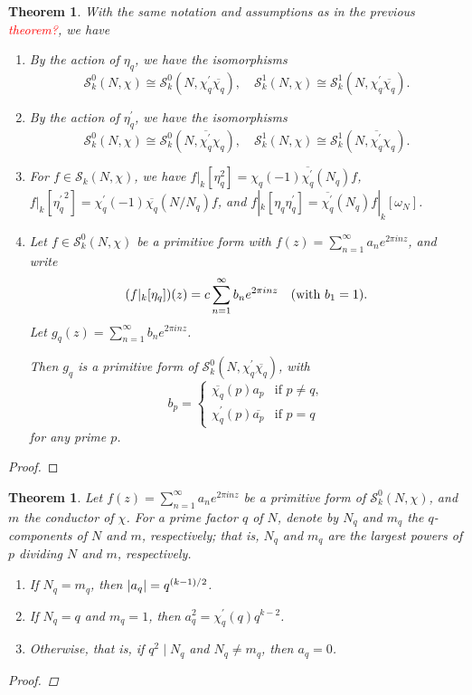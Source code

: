 \documentclass[10pt,leqno,twoside]{article}
\theoremstyle{plain}
\newtheorem{theorem}[lem]{Theorem}
\theoremstyle{definition}
\numberwithin{equation}{section}
\numberwithin{lem}{section}
\newcommand{\textib}[1]{\textbf{\textit{#1\index{#1}}}} %
\newcommand{\tbd}{{\Huge\color{red}{\textib{TO DO}}}}
\newcommand{\sai}[1]{\textcolor{red}{#1}}
\begin{document}
\begin{theorem}\label{thm: miyake thm 4.6.16}
    With the same notation and assumptions as in the previous \sai{theorem?}, we have
    \begin{enumerate}[label=\textup{(\arabic*)}]
        \item By the action of $\eta_q$, we have the isomorphisms \[\mathcal S_k^0(N,\chi)\cong \mathcal S_k^0(N,\chi^\prime_q\overline{\chi_q}),\quad \mathcal S_k^1(N,\chi)\cong \mathcal S_k^1(N,\chi^\prime_q\overline{\chi_q}).\]
        \item By the action of $\eta^\prime_q$, we have the isomorphisms \[\mathcal S_k^0(N,\chi)\cong \mathcal S_k^0(N,\overline{\chi^\prime_q}\chi_q),\quad \mathcal S_k^1(N,\chi)\cong \mathcal S_k^1(N,\overline{\chi^\prime_q}\chi_q).\]
        \item For $f\in\mathcal S_k(N,\chi)$, we have $f|_k[\eta^2_q] = \chi_q(-1)\overline{\chi^\prime_q}(N_q)f$, $f|_k[{\eta^\prime_q}^2] = \chi^\prime_q(-1)\overline{\chi_q}(N/N_q)f$, and $f|_k[\eta_q\eta^\prime_q] = \overline{\chi^\prime_q}(N_q)f|_k[\omega_N]$.
        \item Let $f\in\mathcal S_k^0(N,\chi)$ be a primitive form with $f(z) = \sum_{n=1}^\infty a_ne^{2\pi i n z}$, and write \[(f|_k[\eta_q])(z) = c\sum_{n=1}^\infty b_ne^{2\pi i n z}\quad \text{\textup{(}with $b_1 = 1$\textup{)}}.\] Let $g_q(z) = \sum_{n=1}^\infty b_ne^{2\pi i n z}$.
        
        Then $g_q$ is a primitive form of $\mathcal S_k^0(N,\chi^\prime_q\overline{\chi_q})$, with \[b_p = \begin{cases}
            \overline{\chi_q}(p)a_p &\text{if $p\neq q$},\\
            \chi^\prime_q(p)\overline{a_p} & \text{if $p = q$}
        \end{cases}\] for any prime $p$.
    \end{enumerate}
\end{theorem}
\begin{proof}
    \tbd
\end{proof}
\begin{theorem}\label{thm: miyake thm 4.6.17}
    Let $f(z) = \sum_{n=1}^\infty a_ne^{2\pi i nz}$ be a primitive form of $\mathcal S_k^0(N,\chi)$, and $m$ the conductor of $\chi$. For a prime factor $q$ of $N$, denote by $N_q$ and $m_q$ the $q$-components of $N$ and $m$, respectively; that is, $N_q$ and $m_q$ are the largest powers of $p$ dividing $N$ and $m$, respectively. \begin{enumerate}[label=\textup{(\arabic*)}]
        \item If $N_q = m_q$, then $\abs{a_q} = q^{(k-1)/2}$.
        \item If $N_q = q$ and $m_q = 1$, then $a_q^2 = \chi^\prime_q(q)q^{k-2}$.
        \item Otherwise, that is, if $q^2\mid N_q$ and $N_q \neq m_q$, then $a_q = 0$.
    \end{enumerate}
    \begin{proof}
        \tbd
    \end{proof}
\end{theorem}
\end{document}
